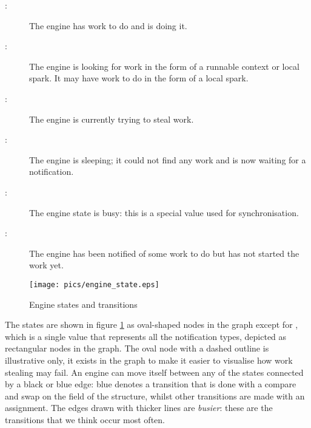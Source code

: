 \begin{description}
    \item[:] The engine has work to do and is doing it.

    \item[:] The engine is looking for work in
        the form of a runnable context or local spark.  It may have work to
        do in the form of a local spark.

    \item[:] The engine is currently trying to steal work.

    \item[:] The engine is sleeping; it could not find any
        work and is now waiting for a notification.

    \item[:] The engine state is busy: this is a special value
        used for synchronisation.

    \item[:] The engine has been notified of some work to
        do but has not started the work yet.
\end{description}

\begin{figure}
\begin{center}
\texttt{[image: pics/engine\_state.eps]}
\end{center}
\caption{Engine states and transitions}
\label{fig:engine_states}
\end{figure}

\noindent
The states are shown in figure \ref{fig:engine_states} as oval-shaped nodes
in the graph except for ,
which is a single value that represents all the notification types,
depicted as rectangular nodes in the graph.
The oval node with a dashed outline is illustrative only,
it exists in the graph to make it easier to visualise how work stealing may
fail.
An engine can move itself between any of the states connected by a black or
blue edge:
blue denotes a transition that is done with a compare and swap on the
 field of the \enginesleepsync structure,
whilst other transitions are made with an assignment.
The edges drawn with thicker lines are \emph{busier}:
these are the transitions that we think occur most often.

